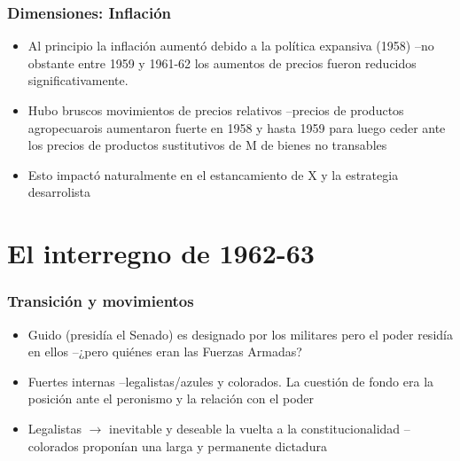 \documentclass[14pt,aspectratio=169]{beamer}
\begin{document}
 \begin{frame}\frametitle{Dimensiones: Inflación}
                 \begin{itemize}\itemsep 5pt \medskip
                 \item Al principio la inflación aumentó debido a la
                   política expansiva (1958) --no obstante entre 1959
                   y 1961-62 los aumentos de precios fueron reducidos
                   significativamente.
                   \item Hubo bruscos movimientos de precios
                     relativos --precios de productos agropecuarois
                     aumentaron fuerte en 1958 y hasta 1959 para luego
                     ceder ante los precios de productos sustitutivos
                     de M de bienes no transables
                     \item Esto impactó naturalmente en el
                       estancamiento de X y la estrategia desarrolista
                   \end{itemize}
               \end{frame}


               


  
               
                 
               
\section{El interregno de 1962-63}


  \begin{frame}\frametitle{Transición y movimientos}
    \begin{itemize}\itemsep 10pt
    \item Guido (presidía el Senado) es designado por los militares
      pero el poder residía en ellos --¿pero quiénes eran las Fuerzas
      Armadas?
      \item Fuertes internas --legalistas/azules y colorados. La
        cuestión de fondo era la posición ante el peronismo y la
        relación con el poder
        \item Legalistas $\longrightarrow$ inevitable y deseable la
          vuelta a la constitucionalidad --colorados proponían una
          larga y permanente dictadura
        \end{itemize}
               \end{frame}
\end{document}
